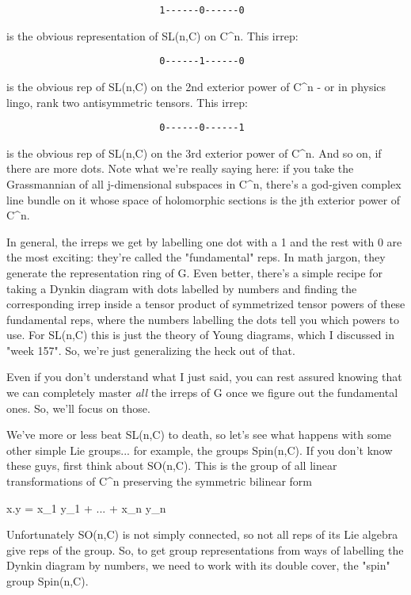 \begin{verbatim}
                           1------0------0
\end{verbatim}
    
is the obvious representation of SL(n,C) on C^{n}.  This irrep:

\begin{verbatim}
                           0------1------0
\end{verbatim}
    
is the obvious rep of SL(n,C) on the 2nd exterior power of C^{n} - 
or in physics lingo, rank two antisymmetric tensors.  This irrep:

\begin{verbatim}
                           0------0------1
\end{verbatim}
    
is the obvious rep of SL(n,C) on the 3rd exterior power of C^{n}.
And so on, if there are more dots.   Note what we're really saying 
here: if you take the Grassmannian of all j-dimensional subspaces
in C^{n}, there's a god-given complex line bundle on it whose space
of holomorphic sections is the jth exterior power of C^{n}.  

In general, the irreps we get by labelling one dot with a 1 and the
rest with 0 are the most exciting: they're called the "fundamental"
reps.  In math jargon, they generate the representation ring of G.  Even
better, there's a simple recipe for taking a Dynkin diagram with dots
labelled by numbers and finding the corresponding irrep inside a
tensor product of symmetrized tensor powers of these fundamental reps,
where the numbers labelling the dots tell you which powers to use.  
For SL(n,C) this is just the theory of Young diagrams, which I discussed 
in "week 157".  So, we're just generalizing the heck out of that.

Even if you don't understand what I just said, you can rest assured
knowing that we can completely master \emph{all} the irreps of G once we
figure out the fundamental ones.  So, we'll focus on those.

We've more or less beat SL(n,C) to death, so let's see what happens with
some other simple Lie groups... for example, the groups Spin(n,C).  If
you don't know these guys, first think about SO(n,C).  This is the group
of all linear transformations of C^{n} preserving the symmetric bilinear
form

x.y = x_{1} y_{1} + ... + x_{n} y_{n}

Unfortunately SO(n,C) is not simply connected, so not all reps of its
Lie algebra give reps of the group.  So, to get group representations
from ways of labelling the Dynkin diagram by numbers, we need to work
with its double cover, the "spin" group Spin(n,C).  

